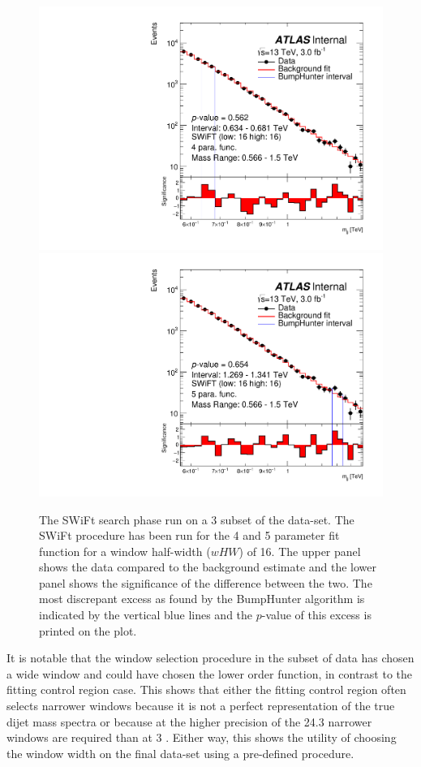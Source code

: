 \begin{figure}[!htb]
\captionsetup[subfigure]{aboveskip=0pt,justification=centering}
\centering
{} {
  \includegraphics[width=0.45\linewidth, angle=0]{figs/Dibjet/LowMass/FitStudy_min566/bhFit_subset_4para_low16_high16.pdf}
}
 {
  \includegraphics[width=0.45\linewidth, angle=0]{figs/Dibjet/LowMass/FitStudy_min566/bhFit_subset_5para_low16_high16.pdf}
}

\caption{\label{fig:bhFit_lm_subset}
  The SWiFt search phase run on a 3 \ifb{} subset of the \lm{} data-set.
  The SWiFt procedure has been run for the 4 and 5 parameter fit function for a window half-width ($wHW$) of 16.
  The upper panel shows the data compared to the background estimate and the lower panel shows the significance of the difference between the two.
  The most discrepant excess as found by the {\sc BumpHunter} algorithm is indicated by the vertical blue lines and the \mbox{$p$-value} of this excess is printed on the plot. }
\end{figure}

It is notable that the window selection procedure in the subset of data has chosen a wide window and
could have chosen the lower order function, in contrast to the fitting control region case. 
This shows that either the fitting control region often selects narrower windows
because it is not a perfect representation of the true dijet mass spectra
or because at the higher precision of the 24.3 \ifb{} narrower windows are required than at 3 \ifb{}.
Either way, this shows the utility of choosing the window width on the final data-set using a pre-defined procedure.

